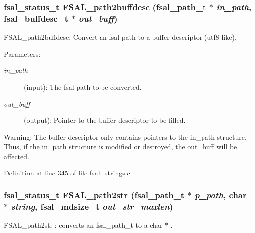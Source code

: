 \subsubsection[{FSAL\_\-path2buffdesc}]{\setlength{\rightskip}{0pt plus 5cm}fsal\_\-status\_\-t FSAL\_\-path2buffdesc (fsal\_\-path\_\-t $\ast$ {\em in\_\-path}, \/  fsal\_\-buffdesc\_\-t $\ast$ {\em out\_\-buff})}\label{group__FSALNameFunctions_g7b4c85ab478349bc2c080f688d35e922}


FSAL\_\-path2buffdesc: Convert an fsal path to a buffer descriptor (utf8 like).

\begin{Desc}
\item[Parameters:]
\begin{description}
\item[{\em in\_\-path}](input): The fsal path to be converted. \item[{\em out\_\-buff}](output): Pointer to the buffer descriptor to be filled.\end{description}
\end{Desc}
\begin{Desc}
\item[Warning:]The buffer descriptor only contains pointers to the in\_\-path structure. Thus, if the in\_\-path structure is modified or destroyed, the out\_\-buff will be affected. \end{Desc}


Definition at line 345 of file fsal\_\-strings.c.
\subsubsection[{FSAL\_\-path2str}]{\setlength{\rightskip}{0pt plus 5cm}fsal\_\-status\_\-t FSAL\_\-path2str (fsal\_\-path\_\-t $\ast$ {\em p\_\-path}, \/  char $\ast$ {\em string}, \/  fsal\_\-mdsize\_\-t {\em out\_\-str\_\-maxlen})}\label{group__FSALNameFunctions_g9763f85fa3ad46d20e37c4f5b8654b44}


FSAL\_\-path2str : converts an fsal\_\-path\_\-t to a char $\ast$ .

